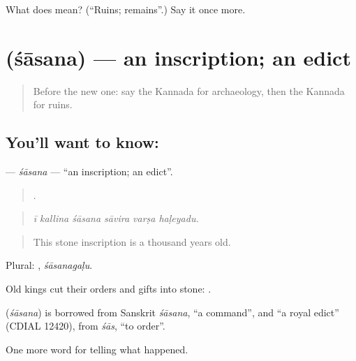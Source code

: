 \begin{tcolorbox}[breakable,colback=teal!4,colframe=teal!35!black,title={Before you move on}]
What does  mean? (\textquotedblleft{}Ruins; remains\textquotedblright{}.) Say it once more.
\end{tcolorbox}
\section[\texorpdfstring{\kn{ಶಾಸನ} (śāsana)}{ಶಾಸನ (śāsana)}]{ (śāsana) — an inscription; an edict}

\label{lesson:KA-C355-sasana}



\begin{quote}
Before the new one: say the Kannada for archaeology, then the Kannada for ruins.
\end{quote}

\subsection*{You'll want to know: }
\textbf{} — \emph{śāsana} — \textquotedblleft{}an inscription; an edict\textquotedblright{}.

\begin{quote}
     .
\end{quote}

\begin{quote}
\emph{ī kallina śāsana sāvira varṣa haḷeyadu.}
\end{quote}

\begin{quote}
This stone inscription is a thousand years old.
\end{quote}

Plural: , \emph{śāsanagaḷu}.

Old kings cut their orders and gifts into stone: .

\begin{cousinweb}
\textbf{} (\emph{śāsana}) is borrowed from Sanskrit \emph{śāsana}, \textquotedblleft{}a command\textquotedblright{}, and \textquotedblleft{}a royal edict\textquotedblright{} (CDIAL 12420), from \emph{śās}, \textquotedblleft{}to order\textquotedblright{}.
\end{cousinweb}

\begin{grammarlens}[title={What you've built}]
One more word for telling what happened.
\end{grammarlens}

